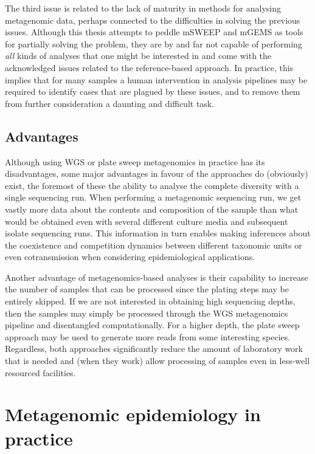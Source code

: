\documentclass[officiallayout]{tktla}
\begin{document}
The third issue is related to the lack of maturity in methods for
analysing metagenomic data, perhaps connected to the difficulties in
solving the previous issues. Although this thesis attempts to peddle
mSWEEP and mGEMS as tools for partially solving the problem, they are
by and far not capable of performing \textit{all} kinds of analyses
that one might be interested in and come with the acknowledged issues
related to the reference-based approach. In practice, this implies
that for many samples a human intervention in analysis pipelines may
be required to identify cases that are plagued by these issues, and to
remove them from further consideration \textemdash{ }  a daunting and
difficult task.

\subsection{Advantages}

Although using WGS or plate sweep metagenomics in practice has its
disadvantages, some major advantages in favour of the approaches do
(obviously) exist, the foremost of these the ability to analyse the
complete diversity with a single sequencing run. When performing a
metagenomic sequencing run, we get vastly more data about the contents
and composition of the sample than what would be obtained even with
several different culture media and subsequent isolate sequencing
runs. This information in turn enables making inferences about the
coexistence and competition dynamics between different taxonomic units
or even cotransmission when considering epidemiological applications.

Another advantage of metagenomics-based analyses is their capability
to increase the number of samples that can be processed since the
plating steps may be entirely skipped. If we are not interested in
obtaining high sequencing depths, then the samples may simply be
processed through the WGS metagenomics pipeline and disentangled
computationally. For a higher depth, the plate sweep approach may be
used to generate more reads from some interesting species. Regardless,
both approaches significantly reduce the amount of laboratory work
that is needed and (when they work) allow processing of samples even
in less-well resourced facilities.

\section{Metagenomic epidemiology in practice}
\end{document}
